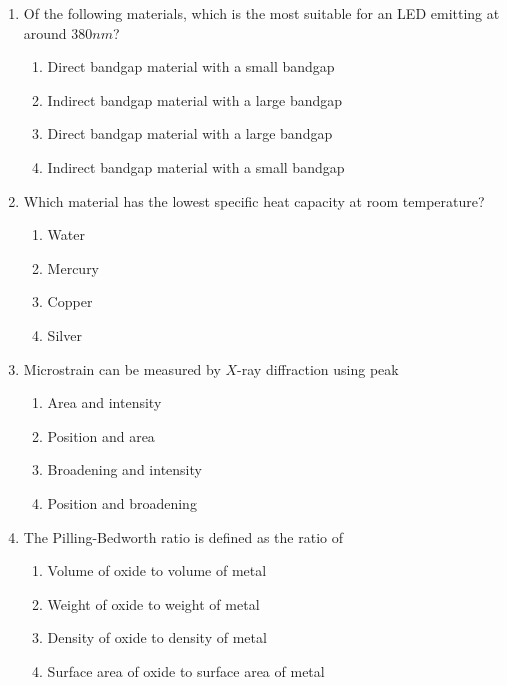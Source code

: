 \documentclass[journal]{IEEEtran}
\begin{document}
\begin{enumerate}[start=1]
\begin{enumerate}
\end{enumerate}
\item Of the following materials, which is the most suitable for an LED emitting at around $380 nm$?
\begin{enumerate}
    \item Direct bandgap material with a small bandgap
    \item Indirect bandgap material with a large bandgap
    \item Direct bandgap material with a large bandgap
    \item Indirect bandgap material with a small bandgap
\end{enumerate}
\item Which material has the lowest specific heat capacity at room temperature?
\begin{enumerate}
    \item Water \item Mercury \item Copper \item Silver
\end{enumerate}
\item Microstrain can be measured by $X$-ray diffraction using peak
\begin{enumerate}
    \item Area and intensity
    \item Position and area
    \item Broadening and intensity
    \item Position and broadening
\end{enumerate}
\item The Pilling-Bedworth ratio is defined as the ratio of
\begin{enumerate}
    \item Volume of oxide to volume of metal
    \item Weight of oxide to weight of metal
    \item Density of oxide to density of metal
    \item Surface area of oxide to surface area of metal
\end{enumerate}
\end{enumerate}
\end{document}

